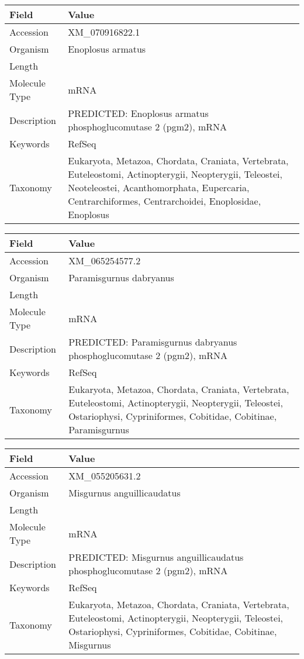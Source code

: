 \documentclass[10pt]{article}
\begin{document}
{\footnotesize
\begin{longtable}{>{\raggedright\arraybackslash}p{4.5cm} >{\raggedright\arraybackslash}p{11.5cm}}
\textbf{Field} & \textbf{Value} \\
\hline
Accession & XM\_070916822.1 \\
Organism & Enoplosus armatus \\
Length & 2825 \\
Molecule Type & mRNA \\
Description & PREDICTED: Enoplosus armatus phosphoglucomutase 2 (pgm2), mRNA \\
Keywords & RefSeq \\
Taxonomy & Eukaryota, Metazoa, Chordata, Craniata, Vertebrata, Euteleostomi, Actinopterygii, Neopterygii, Teleostei, Neoteleostei, Acanthomorphata, Eupercaria, Centrarchiformes, Centrarchoidei, Enoplosidae, Enoplosus \\
\end{longtable}
}

{\footnotesize
\begin{longtable}{>{\raggedright\arraybackslash}p{4.5cm} >{\raggedright\arraybackslash}p{11.5cm}}
\textbf{Field} & \textbf{Value} \\
\hline
Accession & XM\_065254577.2 \\
Organism & Paramisgurnus dabryanus \\
Length & 2299 \\
Molecule Type & mRNA \\
Description & PREDICTED: Paramisgurnus dabryanus phosphoglucomutase 2 (pgm2), mRNA \\
Keywords & RefSeq \\
Taxonomy & Eukaryota, Metazoa, Chordata, Craniata, Vertebrata, Euteleostomi, Actinopterygii, Neopterygii, Teleostei, Ostariophysi, Cypriniformes, Cobitidae, Cobitinae, Paramisgurnus \\
\end{longtable}
}

{\footnotesize
\begin{longtable}{>{\raggedright\arraybackslash}p{4.5cm} >{\raggedright\arraybackslash}p{11.5cm}}
\textbf{Field} & \textbf{Value} \\
\hline
Accession & XM\_055205631.2 \\
Organism & Misgurnus anguillicaudatus \\
Length & 2292 \\
Molecule Type & mRNA \\
Description & PREDICTED: Misgurnus anguillicaudatus phosphoglucomutase 2 (pgm2), mRNA \\
Keywords & RefSeq \\
Taxonomy & Eukaryota, Metazoa, Chordata, Craniata, Vertebrata, Euteleostomi, Actinopterygii, Neopterygii, Teleostei, Ostariophysi, Cypriniformes, Cobitidae, Cobitinae, Misgurnus \\
\end{longtable}
}
\end{document}
